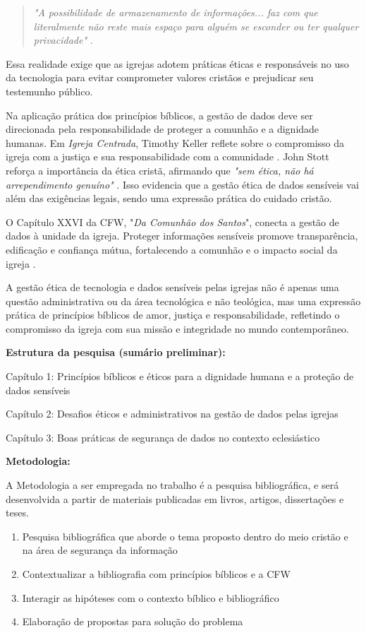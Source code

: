 \documentclass[12pt,a4paper]{article}
\begin{document}
\begin{quote}
\textit{"A possibilidade de armazenamento de informações... faz com que literalmente não reste mais espaço para alguém se esconder ou ter qualquer privacidade"} \cite[p. 180]{schaeffer2002}.
\end{quote}

Essa realidade exige que as igrejas adotem práticas éticas e responsáveis no uso da tecnologia para evitar comprometer valores cristãos e prejudicar seu testemunho público.

Na aplicação prática dos princípios bíblicos, a gestão de dados deve ser direcionada pela responsabilidade de proteger a comunhão e a dignidade humanas. Em \textit{Igreja Centrada}, Timothy Keller reflete sobre o compromisso da igreja com a justiça e sua responsabilidade com a comunidade \cite[p. 209]{keller2014}. John Stott reforça a importância da ética cristã, afirmando que \textit{"sem ética, não há arrependimento genuíno"} \cite[p. 51]{stott2008}. Isso evidencia que a gestão ética de dados sensíveis vai além das exigências legais, sendo uma expressão prática do cuidado cristão.

O Capítulo XXVI da CFW, "\textit{Da Comunhão dos Santos}", conecta a gestão de dados à unidade da igreja. Proteger informações sensíveis promove transparência, edificação e confiança mútua, fortalecendo a comunhão e o impacto social da igreja \cite{cfw}.

A gestão ética de tecnologia e dados sensíveis pelas igrejas não é apenas uma questão administrativa ou da área tecnológica e não teológica, mas uma expressão prática de princípios bíblicos de amor, justiça e responsabilidade, refletindo o compromisso da igreja com sua missão e integridade no mundo contemporâneo.

\noindent
\textbf{Estrutura da pesquisa (sumário preliminar):}

\noindent
Capítulo 1: Princípios bíblicos e éticos para a dignidade humana e a proteção de dados sensíveis

\noindent
Capítulo 2: Desafios éticos e administrativos na gestão de dados pelas igrejas

\noindent
Capítulo 3: Boas práticas de segurança de dados no contexto eclesiástico

\noindent
\textbf{Metodologia:}

A Metodologia a ser empregada no trabalho é a pesquisa bibliográfica, e será desenvolvida a partir de materiais publicadas em livros, artigos, dissertações e teses.
\begin{enumerate}
    \item Pesquisa bibliográfica que aborde o tema proposto dentro do meio cristão e na área de segurança da informação
    \item Contextualizar a bibliografia com princípios bíblicos e a CFW
    \item Interagir as hipóteses com o contexto bíblico e bibliográfico
    \item Elaboração de propostas para solução do problema
\end{enumerate}
\end{document}
